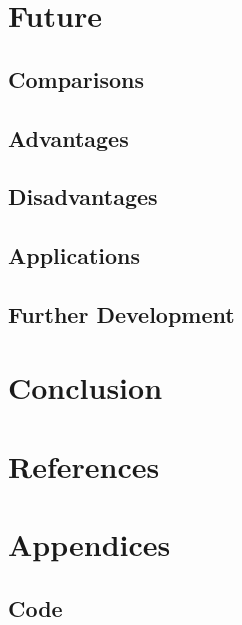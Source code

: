 \documentclass[11pt]{article}
\begin{document}
\clearpage
\section{Future}
\subsection{Comparisons}
\subsection{Advantages}
\subsection{Disadvantages}
\subsection{Applications}
\subsection{Further Development}

\clearpage
\section{Conclusion}


\clearpage
\section{References}
\printbibliography[heading=none]

\clearpage
\section{Appendices}
\subsection{Code}
\end{document}
